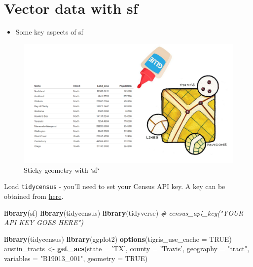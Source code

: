 \documentclass[
]{book}
\newenvironment{Shaded}{\begin{snugshade}}{\end{snugshade}}
\newcommand{\CommentTok}[1]{\textcolor[rgb]{0.56,0.35,0.01}{\textit{#1}}}
\newcommand{\DataTypeTok}[1]{\textcolor[rgb]{0.13,0.29,0.53}{#1}}
\newcommand{\KeywordTok}[1]{\textcolor[rgb]{0.13,0.29,0.53}{\textbf{#1}}}
\newcommand{\NormalTok}[1]{#1}
\newcommand{\OtherTok}[1]{\textcolor[rgb]{0.56,0.35,0.01}{#1}}
\newcommand{\StringTok}[1]{\textcolor[rgb]{0.31,0.60,0.02}{#1}}
\providecommand{\tightlist}{%
  \setlength{\itemsep}{0pt}\setlength{\parskip}{0pt}}
\begin{document}
\hypertarget{vector-data-with-sf}{%
\chapter{Vector data with sf}\label{vector-data-with-sf}}

\begin{itemize}
\tightlist
\item
  Some key aspects of sf
\end{itemize}

\begin{figure}
\includegraphics[width=1.5\linewidth]{images/Sticky} \caption{Sticky geometry with `sf`}\label{fig:unnamed-chunk-19}
\end{figure}

Load \texttt{tidycensus} - you'll need to set your Census API key. A key can be obtained from \href{http://api.census.gov/data/key_signup.html}{here}.

\begin{Shaded}
\begin{Highlighting}[]
\KeywordTok{library}\NormalTok{(sf)}
\KeywordTok{library}\NormalTok{(tidycensus)}
\KeywordTok{library}\NormalTok{(tidyverse)}
\CommentTok{# census_api_key("YOUR API KEY GOES HERE")}
\end{Highlighting}
\end{Shaded}

\begin{Shaded}
\begin{Highlighting}[]
\KeywordTok{library}\NormalTok{(tidycensus)}
\KeywordTok{library}\NormalTok{(ggplot2)}
\KeywordTok{options}\NormalTok{(}\DataTypeTok{tigris_use_cache =} \OtherTok{TRUE}\NormalTok{)}
\NormalTok{austin_tracts <-}\StringTok{ }\KeywordTok{get_acs}\NormalTok{(}\DataTypeTok{state =} \StringTok{'TX'}\NormalTok{, }\DataTypeTok{county =} \StringTok{'Travis'}\NormalTok{, }\DataTypeTok{geography =} \StringTok{"tract"}\NormalTok{,}
                         \DataTypeTok{variables =} \StringTok{"B19013_001"}\NormalTok{, }\DataTypeTok{geometry =} \OtherTok{TRUE}\NormalTok{)}
\end{Highlighting}
\end{Shaded}
\end{document}
